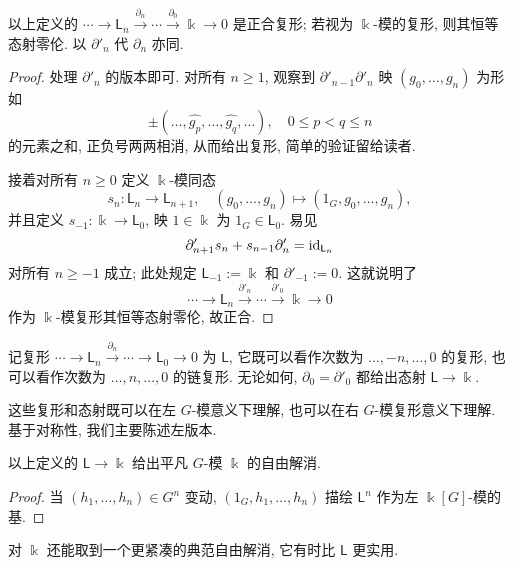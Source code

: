 \begin{lemma}\label{prop:L-acyclic}
	以上定义的 $\cdots \to \mathsf{L}_n \xrightarrow{\partial_n} \cdots \xrightarrow{\partial_0} \Bbbk \to 0$ 是正合复形; 若视为 $\Bbbk$-模的复形, 则其恒等态射零伦. 以 $\partial'_n$ 代 $\partial_n$ 亦同.
\end{lemma}
\begin{proof}
	处理 $\partial'_n$ 的版本即可. 对所有 $n \geq 1$, 观察到 $\partial'_{n-1} \partial'_n$ 映 $(g_0, \ldots, g_n)$ 为形如
	\[ \pm (\ldots, \widehat{g_p}, \ldots, \widehat{g_q}, \ldots), \quad 0 \leq p < q \leq n \]
	的元素之和, 正负号两两相消, 从而给出复形, 简单的验证留给读者.
	
	接着对所有 $n \geq 0$ 定义 $\Bbbk$-模同态
	\[ s_n: \mathsf{L}_n \to \mathsf{L}_{n+1}, \quad (g_0, \ldots, g_n) \mapsto (1_G, g_0, \ldots, g_n), \]
	并且定义 $s_{-1}: \Bbbk \to \mathsf{L}_0$, 映 $1 \in \Bbbk$ 为 $1_G \in \mathsf{L}_0$. 易见
	\[ \partial'_{n+1} s_n + s_{n-1} \partial'_n = \mathrm{id}_{\mathsf{L}_n} \]
	对所有 $n \geq -1$ 成立; 此处规定 $\mathsf{L}_{-1} := \Bbbk$ 和 $\partial'_{-1} := 0$. 这就说明了
	\[ \cdots \to \mathsf{L}_n \xrightarrow{\partial'_n} \cdots \xrightarrow{\partial'_0} \Bbbk \to 0 \]
	作为 $\Bbbk$-模复形其恒等态射零伦, 故正合.
\end{proof}

记复形 $\cdots \to \mathsf{L}_n \xrightarrow{\partial_n} \cdots \to \mathsf{L}_0 \to 0$ 为 $\mathsf{L}$, 它既可以看作次数为 $\ldots, -n, \ldots, 0$ 的复形, 也可以看作次数为 $\ldots, n, \ldots, 0$ 的链复形. 无论如何, $\partial_0 = \partial'_0$ 都给出态射 $\mathsf{L} \to \Bbbk$.

这些复形和态射既可以在左 $G$-模意义下理解, 也可以在右 $G$-模复形意义下理解. 基于对称性, 我们主要陈述左版本.

\begin{proposition}\label{prop:trivial-mod-resolution}
	以上定义的 $\mathsf{L} \to \Bbbk$ 给出平凡 $G$-模 $\Bbbk$ 的自由解消.
\end{proposition}
\begin{proof}
	当 $(h_1, \ldots, h_n) \in G^n$ 变动, $(1_G, h_1, \ldots, h_n)$ 描绘 $\mathsf{L}^n$ 作为左 $\Bbbk[G]$-模的基.
\end{proof}

对 $\Bbbk$ 还能取到一个更紧凑的典范自由解消, 它有时比 $\mathsf{L}$ 更实用.


